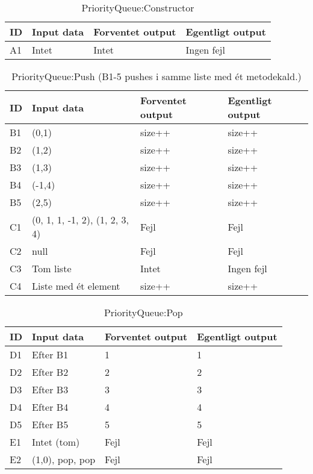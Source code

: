 
\begin{table}[!h]
	\caption{PriorityQueue:Constructor}
	\centering
	\begin{tabular}{L L L L}
		\hline\hline
		ID & Input data & Forventet output & Egentligt output \\ [0.5ex]
		\hline
		A1 & Intet & Intet & Ingen fejl\\
		\hline
	\end{tabular}
\end{table}

\begin{table}[!h]
	\caption{PriorityQueue:Push (B1-5 pushes i samme liste med ét metodekald.)}
	\centering
	\begin{tabular}{L L L L}
		\hline\hline
		ID & Input data & Forventet output & Egentligt output \\ [0.5ex]
		\hline
		B1 & (0,1) & size++ & size++\\
		B2 & (1,2) & size++ & size++\\
		B3 & (1,3) & size++ & size++\\
		B4 & (-1,4) & size++ & size++\\
		B5 & (2,5) & size++ & size++\\
		C1 & (0, 1, 1, -1, 2), (1, 2, 3, 4) & Fejl & Fejl\\
		C2 & null & Fejl & Fejl\\
		C3 & Tom liste & Intet & Ingen fejl\\
		C4 & Liste med ét element & size++ & size++\\
		\hline
	\end{tabular}
\end{table}

\begin{table}[!h]
	\caption{PriorityQueue:Pop}
	\centering
	\begin{tabular}{L L L L}
		\hline\hline
		ID & Input data & Forventet output & Egentligt output \\ [0.5ex]
		\hline
		D1 & Efter B1 & 1 & 1\\
		D2 & Efter B2 & 2 & 2\\
		D3 & Efter B3 & 3 & 3\\
		D4 & Efter B4 & 4 & 4\\
		D5 & Efter B5 & 5 & 5\\
		E1 & Intet (tom) & Fejl & Fejl\\
		E2 & (1,0), pop, pop & Fejl & Fejl\\
		\hline
	\end{tabular}
\end{table}

